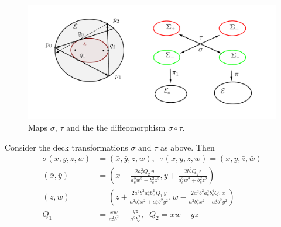\begin{figure}
	\begin{center}
		 \includegraphics[scale=0.45]{chap_05/pics/pics-05-050-orbitas-dinamica.pdf}
		\caption{Maps $\sigma$, $\tau$ and the the diffeomorphism $\sigma\circ\tau$.}
	\end{center}
\label{fig:caustic2}
\end{figure}


\begin{lemma}
Consider the deck transformations $\sigma$ and $\tau$ as above.
Then
\begin{align*}
   \sigma(x,y,z,w) &=(\bar x, \bar y,z,w),\;\; \tau(x,y,z,w)=(x,y,\bar z,\bar w)\\
   (\bar x,\bar y)&=\left( x - \frac{2 a_c^2        Q_2\, w}{a_c^2  w^2 + b_c^2  z^2}, y + \frac{2  b_c^2     Q_2 z}{a_c^2  w^2 + b_c^2  z^2}\right) \\
   (\bar z,\bar w)&=\left( z+\frac{2a^2 b^2 a_c^4 b_c^2  \,    Q_1\, y}{a^2 b_c^4 x^2 + a_c^4 b^2 y^2}, w-\frac{2 a^2 b^2 a_c^2 b_c^4     Q_1\, x}{a^2 b_c^4 x^2 + a_c^4 b^2 y^2} \right)\\
      Q_1 &=\frac{x w}{ a_c^2 b^2} - \frac{y z}{a^2 b_c^2}, \;\;    Q_2=x w-y z\\
\end{align*}
\end{lemma}

